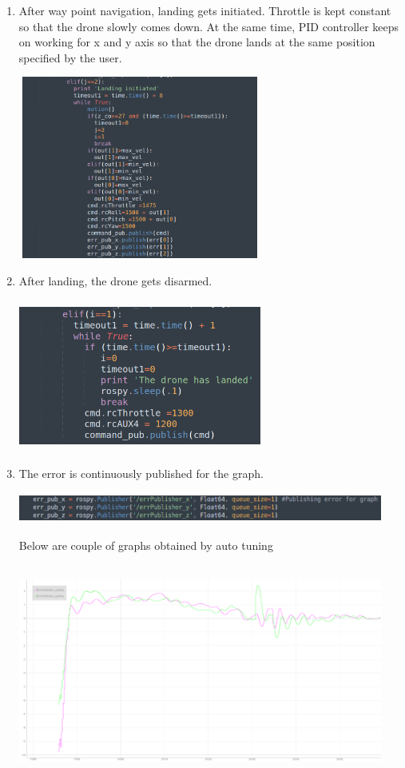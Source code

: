 \documentclass[a4paper,12pt,oneside]{book}
\begin{document}
\begin{enumerate}
\item After way point navigation, landing gets initiated. Throttle is kept constant so that the drone slowly comes down. At the same time, PID controller keeps on working for x and y axis so that the drone lands at the same position specified by the user.


\includegraphics[width = 8cm , height= 6cm]{landing.png}


\item After landing, the drone gets disarmed.


\includegraphics[width = 8cm , height= 5cm]{disarm.png}
\pagebreak
\item The error is continuously published for the graph.


\includegraphics[width = 12cm , height= 1cm]{err_pub_9.png}

Below are couple of graphs obtained by auto tuning


\includegraphics[width = 12cm , height= 7cm]{Autotune_iteration_1.png}



\end{enumerate}
\end{document}
